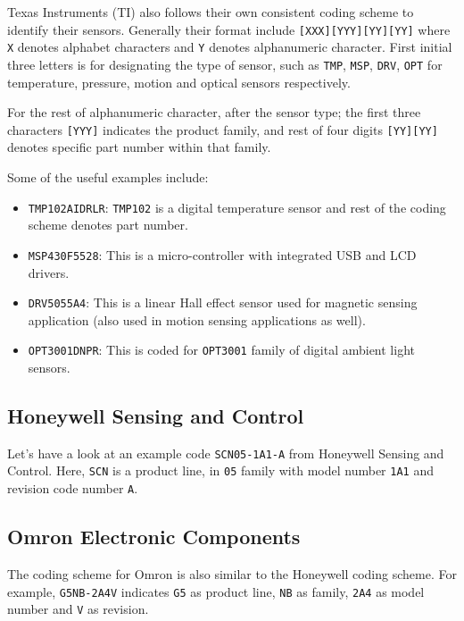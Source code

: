 Texas Instruments (TI) also follows their own consistent coding scheme to identify their sensors. Generally their format include \texttt{[XXX][YYY][YY][YY]} where \texttt{X} denotes alphabet characters and \texttt{Y} denotes alphanumeric character. First initial three letters is for designating the type of sensor, such as \texttt{TMP}, \texttt{MSP}, \texttt{DRV}, \texttt{OPT} for temperature, pressure, motion and optical sensors respectively.

For the rest of alphanumeric character, after the sensor type; the first three characters \texttt{[YYY]} indicates the product family, and rest of four digits \texttt{[YY][YY]} denotes specific part number within that family.

Some of the useful examples include:
\begin{itemize}
    \item \texttt{TMP102AIDRLR}: \texttt{TMP102} is a digital temperature sensor and rest of the coding scheme denotes part number.
    \item \texttt{MSP430F5528}: This is a micro-controller with integrated USB and LCD drivers.
    \item \texttt{DRV5055A4}: This is a linear Hall effect sensor used for magnetic sensing application (also used in motion sensing applications as well).
    \item \texttt{OPT3001DNPR}: This is coded for \texttt{OPT3001} family of digital ambient light sensors.
\end{itemize}



\subsection{Honeywell Sensing and Control}

Let's have a look at an example code \texttt{SCN05-1A1-A} from Honeywell Sensing and Control. Here, \texttt{SCN} is a product line, in \texttt{05} family with model number \texttt{1A1} and revision code number \texttt{A}.

\subsection{Omron Electronic Components}

The coding scheme for Omron is also similar to the Honeywell coding scheme. For example, \texttt{G5NB-2A4V} indicates \texttt{G5} as product line, \texttt{NB} as family, \texttt{2A4} as model number and \texttt{V} as revision.

